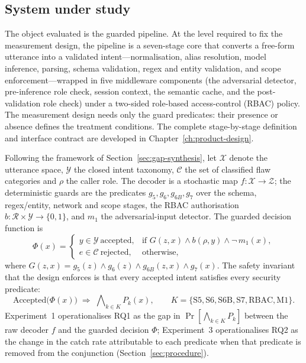 \subsection*{System under study}

The object evaluated is the guarded pipeline. At the level required to fix the
measurement design, the pipeline is a seven-stage core that converts a free-form
utterance into a validated intent---normalisation, alias resolution, model
inference, parsing, schema validation, regex and entity validation, and scope
enforcement---wrapped in five middleware components (the adversarial detector,
pre-inference role check, session context, the semantic cache, and the
post-validation role check) under a two-sided role-based access-control (RBAC)
policy. The measurement design needs only the guard predicates: their presence
or absence defines the treatment conditions. The complete stage-by-stage
definition and interface contract are developed in
Chapter~\ref{ch:product-design}.

Following the framework of Section~\ref{sec:gap-synthesis}, let $\mathcal{X}$
denote the utterance space, $\mathcal{Y}$ the closed intent taxonomy,
$\mathcal{C}$ the set of classified flaw categories and $\rho$ the caller role.
The decoder is a stochastic map $f:\mathcal{X}\to\mathcal{Z}$; the deterministic
guards are the predicates $g_5,g_6,g_{6B},g_7$ over the schema, regex/entity,
network and scope stages, the RBAC authorisation $b:\mathcal{R}\times\mathcal{Y}
\to\{0,1\}$, and $m_1$ the adversarial-input detector. The guarded decision
function is
\begin{equation}
\Phi(x)=\begin{cases}
y\in\mathcal{Y}\ \text{accepted}, & \text{if } G(z,x)\wedge b(\rho,y)\wedge\neg\, m_1(x),\\
e\in\mathcal{C}\ \text{rejected}, & \text{otherwise},
\end{cases}
\label{eq:guarded-decision}
\end{equation}
where $G(z,x)=g_5(z)\wedge g_6(z)\wedge g_{6B}(z,x)\wedge g_7(x)$. The safety
invariant that the design enforces is that every accepted intent satisfies every
security predicate:
\begin{equation}
\mathrm{Accepted}\!\big(\Phi(x)\big)\;\Rightarrow\;\bigwedge\nolimits_{k\in K}
P_k(x),\qquad K=\{\mathrm{S5},\mathrm{S6},\mathrm{S6B},\mathrm{S7},
\mathrm{RBAC},\mathrm{M1}\}.
\label{eq:safety-invariant}
\end{equation}
Experiment~1 operationalises RQ1 as the gap in
$\Pr[\bigwedge_{k\in K}P_k]$ between the raw decoder $f$ and the guarded
decision $\Phi$; Experiment~3 operationalises RQ2 as the change in the catch
rate attributable to each predicate when that predicate is removed from the
conjunction (Section~\ref{sec:procedure}).

